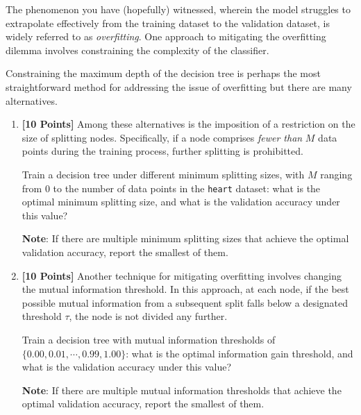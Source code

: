     The phenomenon you have (hopefully) witnessed, wherein the model struggles to extrapolate effectively from the training dataset to the validation dataset, is widely referred to as \textit{overfitting}. One approach to mitigating the overfitting dilemma involves constraining the complexity of the classifier.

    Constraining the maximum depth of the decision tree is perhaps the most straightforward method for addressing the issue of overfitting but there are many alternatives. 

    \begin{enumerate}
    \item[5.] {\bf [10 Points]} Among these alternatives is the imposition of a restriction on the size of splitting nodes. Specifically, if a node comprises \textit{fewer than} $M$ data points during the training process, further splitting is prohibitted.

    Train a decision tree under different minimum splitting sizes, with $M$ ranging from $0$ to the number of data points in the \texttt{heart} dataset: what is the optimal minimum splitting size, and what is the validation accuracy under this value?

    \textbf{Note}: If there are multiple minimum splitting sizes that achieve the optimal validation accuracy, report the smallest of them.
    
    \begin{tcolorbox}[fit,height=1.5cm, width=15cm, blank, borderline={1pt}{-2pt},nobeforeafter]
    \end{tcolorbox}
    


    \item[6.] {\bf [10 Points]} Another technique for mitigating overfitting involves changing the mutual information threshold. In this approach, at each node, if the best possible mutual information from a subsequent split falls below a designated threshold $\tau$, the node is not divided any further.

    Train a decision tree with mutual information thresholds of $\{0.00, 0.01, \cdots, 0.99, 1.00\}$: what is the optimal information gain threshold, and what is the validation accuracy under this value? 
    
    \textbf{Note}: If there are multiple mutual information thresholds that achieve the optimal validation accuracy, report the smallest of them.
    
    \begin{tcolorbox}[fit,height=1.5cm, width=15cm, blank, borderline={1pt}{-2pt},nobeforeafter]
    \end{tcolorbox}

    
\end{enumerate}

